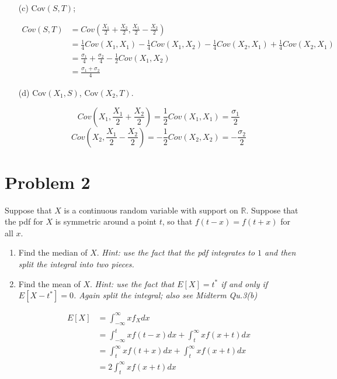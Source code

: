 \documentclass{article}
\newcommand{\1}{\mathbf{1}}
\begin{document}
\begin{enumerate}
    \item[(c)] Cov$(S,T)$;

    \begin{align*}
        Cov(S, T) &= Cov\left(\frac{X_1}{2}+\frac{X_2}{2}, \frac{X_1}{2}-\frac{X_2}{2} \right) \\
        &= \frac{1}{4} Cov(X_1, X_1) - \frac{1}{4} Cov(X_1, X_2) - \frac{1}{4}Cov(X_2, X_1) + \frac{1}{4} Cov(X_2, X_1)\\
        &= \frac{\sigma_1}{4} + \frac{\sigma_2}{4} - \frac{1}{2}Cov(X_1, X_2) \\
        &= \frac{\sigma_1 + \sigma_2}{4}
    \end{align*}

    \item[(d)] Cov$(X_1,S)$, Cov$(X_2,T)$.
    
    $$Cov\left(X_1, \frac{X_1}{2}+\frac{X_2}{2}\right) = \frac{1}{2} Cov(X_1, X_1) =  \frac{\sigma_1}{2} $$
    $$Cov\left(X_2, \frac{X_1}{2}-\frac{X_2}{2}\right) = -\frac{1}{2} Cov(X_2, X_2) =  -\frac{\sigma_2}{2} $$
\end{enumerate}



\newpage
\section*{Problem 2}
Suppose that $X$ is a continuous random variable with support on $\mathbb{R}$. Suppose that the pdf for $X$ is symmetric around a point $t$, so that $f(t-x) = f(t+x)$ for all $x$.
\begin{enumerate}
    \item Find the median of $X$. {\it Hint: use the fact that the pdf integrates to $1$ and then split the integral into two pieces.}
    
    
    \item Find the mean of $X$. {\it Hint: use the fact that $E[X] = t^*$ if and only if $E[X-t^*]=0$. Again split the integral; also see Midterm Qu.3(b)} 
    
    \begin{align*}
        E[X] &= \int_{-\infty}^\infty xf_X dx \\
        &= \int_{-\infty}^t xf(t-x)dx + \int_t^\infty xf(x+t)dx \\
        &= \int_t^\infty xf(t+x)dx + \int_t^\infty xf(x+t)dx \\
        &= 2\int_t^\infty xf(x+t)dx
    \end{align*}
\end{enumerate}
\end{document}
